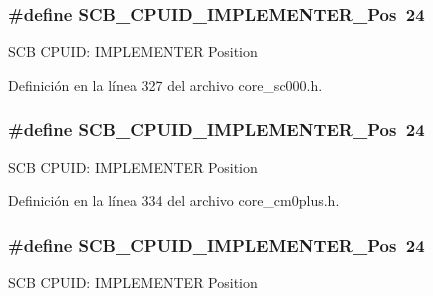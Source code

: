 \subsubsection[{\texorpdfstring{S\+C\+B\+\_\+\+C\+P\+U\+I\+D\+\_\+\+I\+M\+P\+L\+E\+M\+E\+N\+T\+E\+R\+\_\+\+Pos}{SCB_CPUID_IMPLEMENTER_Pos}}]{\setlength{\rightskip}{0pt plus 5cm}\#define S\+C\+B\+\_\+\+C\+P\+U\+I\+D\+\_\+\+I\+M\+P\+L\+E\+M\+E\+N\+T\+E\+R\+\_\+\+Pos~24}\hypertarget{group___c_m_s_i_s___s_c_b_ga58686b88f94f789d4e6f429fe1ff58cf}{}\label{group___c_m_s_i_s___s_c_b_ga58686b88f94f789d4e6f429fe1ff58cf}
S\+CB C\+P\+U\+ID\+: I\+M\+P\+L\+E\+M\+E\+N\+T\+ER Position 

Definición en la línea 327 del archivo core\+\_\+sc000.\+h.

\subsubsection[{\texorpdfstring{S\+C\+B\+\_\+\+C\+P\+U\+I\+D\+\_\+\+I\+M\+P\+L\+E\+M\+E\+N\+T\+E\+R\+\_\+\+Pos}{SCB_CPUID_IMPLEMENTER_Pos}}]{\setlength{\rightskip}{0pt plus 5cm}\#define S\+C\+B\+\_\+\+C\+P\+U\+I\+D\+\_\+\+I\+M\+P\+L\+E\+M\+E\+N\+T\+E\+R\+\_\+\+Pos~24}\hypertarget{group___c_m_s_i_s___s_c_b_ga58686b88f94f789d4e6f429fe1ff58cf}{}\label{group___c_m_s_i_s___s_c_b_ga58686b88f94f789d4e6f429fe1ff58cf}
S\+CB C\+P\+U\+ID\+: I\+M\+P\+L\+E\+M\+E\+N\+T\+ER Position 

Definición en la línea 334 del archivo core\+\_\+cm0plus.\+h.

\subsubsection[{\texorpdfstring{S\+C\+B\+\_\+\+C\+P\+U\+I\+D\+\_\+\+I\+M\+P\+L\+E\+M\+E\+N\+T\+E\+R\+\_\+\+Pos}{SCB_CPUID_IMPLEMENTER_Pos}}]{\setlength{\rightskip}{0pt plus 5cm}\#define S\+C\+B\+\_\+\+C\+P\+U\+I\+D\+\_\+\+I\+M\+P\+L\+E\+M\+E\+N\+T\+E\+R\+\_\+\+Pos~24}\hypertarget{group___c_m_s_i_s___s_c_b_ga58686b88f94f789d4e6f429fe1ff58cf}{}\label{group___c_m_s_i_s___s_c_b_ga58686b88f94f789d4e6f429fe1ff58cf}
S\+CB C\+P\+U\+ID\+: I\+M\+P\+L\+E\+M\+E\+N\+T\+ER Position 

